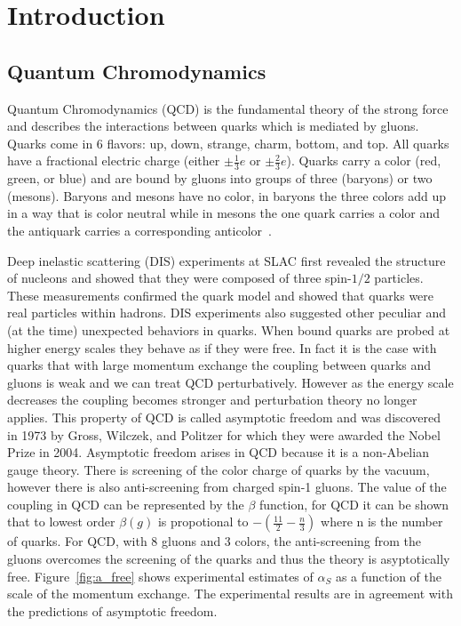 \chapter{Introduction}

\section{Quantum Chromodynamics}

Quantum Chromodynamics (QCD) is the fundamental theory of the strong force and describes the interactions between quarks which is mediated by gluons. Quarks come in 6 flavors: up, down, strange, charm, bottom, and top. All quarks have a fractional electric charge (either $\pm \frac{1}{3}e$ or $\pm \frac{2}{3}e$). Quarks carry a color (red, green, or blue) and are bound by gluons into groups of three (baryons) or two (mesons). Baryons and mesons have no color, in baryons the three colors add up in a way that is color neutral while in mesons the one quark carries a color and the antiquark carries a corresponding anticolor~\cite{quarkmod}. 

Deep inelastic scattering (DIS) experiments at SLAC first revealed the structure of nucleons and showed that they were composed of three spin-$1/2$ particles. These measurements confirmed the quark model and showed that quarks were real particles within hadrons. DIS experiments also suggested other peculiar and (at the time) unexpected behaviors in quarks. When bound quarks are probed at higher energy scales they behave as if they were free. In fact it is the case with quarks that with large momentum exchange the coupling between quarks and gluons is weak and we can treat QCD perturbatively. However as the energy scale decreases the coupling becomes stronger and perturbation theory no longer applies. This property of QCD is called asymptotic freedom and was discovered in 1973 by Gross, Wilczek, and Politzer for which they were awarded the Nobel Prize in 2004. Asymptotic freedom arises in QCD because it is a non-Abelian gauge theory. There is screening of the color charge of quarks by the vacuum, however there is also anti-screening from charged spin-1 gluons. The value of the coupling in QCD can be represented by the $\beta$ function, for QCD it can be shown that to lowest order $\beta(g)$ is propotional to $-(\frac{11}{2} - \frac{n}{3})$ where n is the number of quarks. For QCD, with 8 gluons and 3 colors, the anti-screening from the gluons overcomes the screening of the quarks and thus the theory is asyptotically free. Figure~\ref{fig:a_free} shows experimental estimates of $\alpha_S$ as a function of the scale of the momentum exchange. The experimental results are in agreement with the predictions of asymptotic freedom. 


